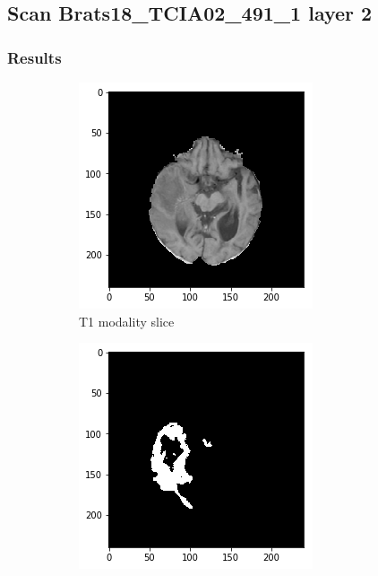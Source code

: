 \subsection{Scan Brats18\_TCIA02\_491\_1 layer 2}
\subsubsection{Results}


\begin{figure}[H]
    \centering
    \begin{subfigure}[t]{.24\textwidth}
        \centering
        \includegraphics[width=\linewidth]{chapters/06_hdm/a_Brats18_TCIA02_491_1_L2/1.png}
        \caption{T1 modality slice}
    \end{subfigure}%
    \begin{subfigure}[t]{.24\textwidth}
        \centering
        \includegraphics[width=\linewidth]{chapters/06_hdm/a_Brats18_TCIA02_491_1_L2/0.png}

\end{subfigure}
\end{figure}
